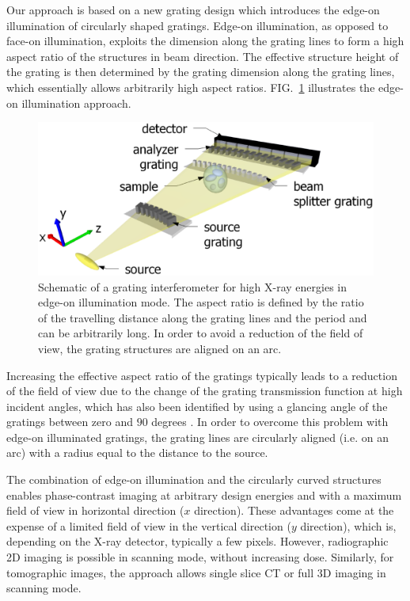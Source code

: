 \documentclass[aip,apl,amsmath,amssymb,floatfix,reprint,a4paper]{revtex4-1}
\begin{document}
Our approach is based on a new grating design which introduces the edge-on illumination of circularly shaped gratings. Edge-on illumination, as opposed to face-on illumination, exploits the dimension along the grating lines to form a high aspect ratio of the structures in beam direction. The effective structure height of the grating is then determined by the grating dimension along the grating lines, which essentially allows arbitrarily high aspect ratios. FIG.~\ref{Fig:schematic} illustrates the edge-on illumination approach.
\begin{figure} [ht]
  \includegraphics[width = \linewidth]{figures/figure1.eps}
  \caption{Schematic of a grating interferometer for high X-ray energies in edge-on illumination mode. The aspect ratio is defined by the ratio of the travelling distance along the grating lines and the period and can be arbitrarily long. In order to avoid a reduction of the field of view, the grating structures are aligned on an arc.}
  \label{Fig:schematic}
\end{figure}

Increasing the effective aspect ratio of the gratings typically leads to a reduction of the field of view due to the change of the grating transmission function at high incident angles, which has also been identified by using a glancing angle of the gratings between zero and $90$ degrees \cite{Stutman2012a}. In order to overcome this problem with edge-on illuminated gratings, the grating lines are circularly aligned (i.e. on an arc) with a radius equal to the distance to the source.

The combination of edge-on illumination and the circularly curved structures enables phase-contrast imaging at arbitrary design energies and with a maximum field of view in horizontal direction ($x$ direction). These advantages come at the expense of a limited field of view in the vertical direction ($y$ direction), which is, depending on the X-ray detector, typically a few pixels. However, radiographic 2D imaging is possible in scanning mode, without increasing dose. Similarly, for tomographic images, the approach allows single slice CT or full 3D imaging in scanning mode.
\end{document}

